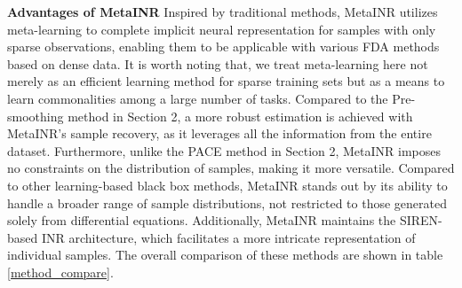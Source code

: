 \documentclass{article}
\begin{document}
\textbf{Advantages of MetaINR}
Inspired by traditional methods, MetaINR utilizes meta-learning to complete implicit neural representation for samples with only sparse observations, 
enabling them to be applicable with various FDA methods based on dense data.
It is worth noting that, we treat meta-learning here not merely as an efficient learning method for sparse training sets but as a means to learn commonalities among a large number of tasks.
Compared to the Pre-smoothing method in Section 2, a more robust estimation is achieved with MetaINR's sample recovery, as it leverages all the information from the entire dataset. 
Furthermore, unlike the PACE method in Section 2, 
MetaINR imposes no constraints on the distribution of samples, making it more versatile.
Compared to other learning-based black box methods, MetaINR stands out by its ability to handle a broader range of sample distributions, not restricted to those generated solely from differential equations.
Additionally, MetaINR maintains the SIREN-based INR architecture, which facilitates a more intricate representation of individual samples.
The overall comparison of these methods are shown in table \ref{method_compare}.
\end{document}
